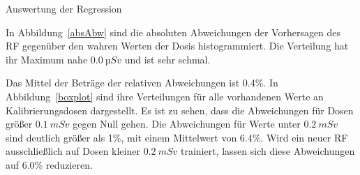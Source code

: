 \documentclass[20pt]{beamer}
\begin{document}
\begin{columns}[t, onlytextwidth]
\begin{column}{0.333\textwidth}
\begin{block}{Auswertung der Regression}
                  \begin{large}
                  In Abbildung~\ref{absAbw} sind die absoluten Abweichungen der Vorhersagen des RF gegenüber den wahren Werten der Dosis histogrammiert. Die Verteilung hat ihr Maximum nahe $\SI{0.0}{µSv}$ und ist sehr schmal. 
                  \end{large}

                  \begin{large}
                  Das Mittel der Beträge der relativen Abweichungen ist 0.4\%. In Abbildung~\ref{boxplot} sind ihre Verteilungen für alle vorhandenen Werte an Kalibrierungsdosen dargestellt. Es ist zu sehen, dass die Abweichungen für Dosen größer $\SI{0.1}{mSv}$ gegen Null gehen. Die Abweichungen für Werte unter $\SI{0.2}{mSv}$ sind deutlich größer als 1\%, mit einem Mittelwert von 6.4\%. 
                     Wird ein neuer RF ausschließlich auf Dosen kleiner $\SI{0.2}{mSv}$ trainiert, lassen sich diese Abweichungen auf 6.0\% reduzieren. 
                  \end{large}


\end{block}
\end{column}
\end{columns}
\end{document}
